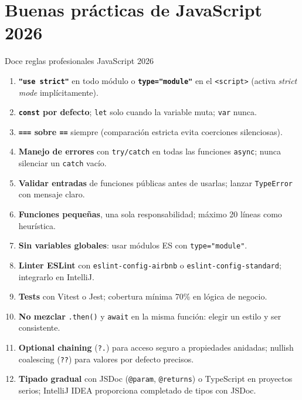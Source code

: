 \documentclass[11pt,a4paper,openany]{book}
\begin{document}
	\section{Buenas prácticas de JavaScript 2026}
	\label{sec:4.buenas}
	
	\begin{cajabuenas}{Doce reglas profesionales JavaScript 2026}
		\begin{enumerate}
			\item \textbf{\texttt{"use strict"}} en todo módulo o
			\textbf{\texttt{type="module"}} en el \texttt{<script>}
			(activa \emph{strict mode} implícitamente).
			\item \textbf{\texttt{const} por defecto}; \texttt{let} solo
			cuando la variable muta; \texttt{var} nunca.
			\item \textbf{\texttt{===} sobre \texttt{==}} siempre
			(comparación estricta evita coerciones silenciosas).
			\item \textbf{Manejo de errores} con \texttt{try/catch} en
			todas las funciones \texttt{async}; nunca silenciar un
			\texttt{catch} vacío.
			\item \textbf{Validar entradas} de funciones públicas antes de
			usarlas; lanzar \texttt{TypeError} con mensaje claro.
			\item \textbf{Funciones pequeñas}, una sola responsabilidad;
			máximo 20 líneas como heurística.
			\item \textbf{Sin variables globales}: usar módulos ES con
			\texttt{type="module"}.
			\item \textbf{Linter ESLint} con \texttt{eslint-config-airbnb}
			o \texttt{eslint-config-standard}; integrarlo en IntelliJ.
			\item \textbf{Tests} con Vitest o Jest; cobertura mínima 70\%
			en lógica de negocio.
			\item \textbf{No mezclar} \texttt{.then()} y \texttt{await}
			en la misma función: elegir un estilo y ser consistente.
			\item \textbf{Optional chaining} (\texttt{?.}) para acceso
			seguro a propiedades anidadas; nullish coalescing (\texttt{??})
			para valores por defecto precisos.
			\item \textbf{Tipado gradual} con JSDoc (\texttt{@param},
			\texttt{@returns}) o TypeScript en proyectos serios;
			IntelliJ IDEA proporciona completado de tipos con JSDoc.
		\end{enumerate}
	\end{cajabuenas}
	
\end{document}

